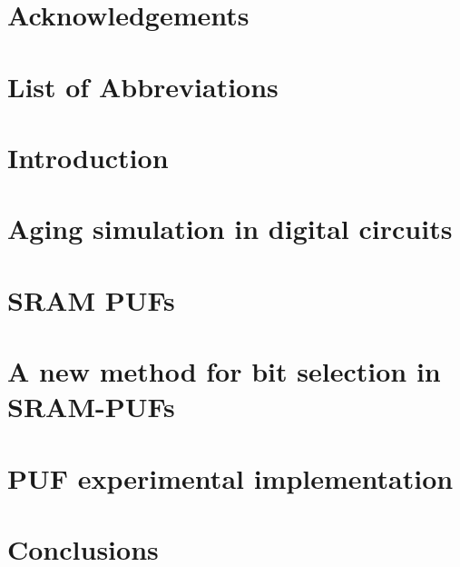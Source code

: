 \documentclass[
    12pt,
    twoside, 
    ]{report}
\author{Andrés Santana Andreo}
\begin{document}
\newcommand{\longstring}[1]{{\ttfamily\seqsplit{#1}}}
\thispagestyle{empty}
\maketitle
\chapter*{Acknowledgements}

\chapter*{List of Abbreviations}
\printglossaries
\tableofcontents{\small}
\listoffigures
\listoftables


\chapter{Introduction}

\chapter{Aging simulation in digital circuits}

\chapter{SRAM PUFs}

\chapter{A new method for bit selection in SRAM-PUFs}

\chapter{PUF experimental implementation}

% 
\chapter{Conclusions}




% 

\printbibliography{}

\clearpage



\clearpage
\end{document}
